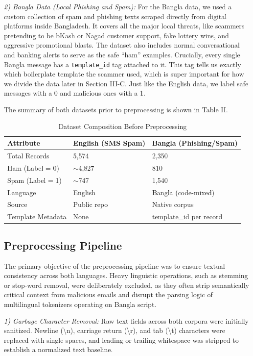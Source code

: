 \documentclass[journal]{IEEEtran}
\begin{document}
\textit{2) Bangla Data (Local Phishing and Spam):} For the Bangla data, we used a custom collection of spam and phishing texts scraped directly from digital platforms inside Bangladesh. It covers all the major local threats, like scammers pretending to be bKash or Nagad customer support, fake lottery wins, and aggressive promotional blasts. The dataset also includes normal conversational and banking alerts to serve as the safe ``ham'' examples. Crucially, every single Bangla message has a \texttt{template\_id} tag attached to it. This tag tells us exactly which boilerplate template the scammer used, which is super important for how we divide the data later in Section III-C. Just like the English data, we label safe messages with a 0 and malicious ones with a 1.

The summary of both datasets prior to preprocessing is shown in Table
II.

\begin{table}[htbp]
\caption{Dataset Composition Before Preprocessing}
\label{tab:dataset_raw}
\centering
\begin{tabular}{lll}
\toprule
\textbf{Attribute} & \textbf{English (SMS Spam)} & \textbf{Bangla (Phishing/Spam)} \\
\midrule
Total Records & 5,574 & 2,350 \\
Ham (Label = 0) & $\sim$4,827 & 810 \\
Spam (Label = 1) & $\sim$747 & 1,540 \\
Language & English & Bangla (code-mixed) \\
Source & Public repo \cite{ref1} & Native corpus \\
Template Metadata & None & template\_id per record \\
\bottomrule
\end{tabular}
\end{table}

\subsection{Preprocessing Pipeline}

The primary objective of the preprocessing pipeline was to ensure textual consistency across both languages. Heavy linguistic operations, such as stemming or stop-word removal, were deliberately excluded, as they often strip semantically critical context from malicious emails and disrupt the parsing logic of multilingual tokenizers operating on Bangla script.

\textit{1) Garbage Character Removal:} Raw text fields across both corpora were initially sanitized. Newline (\textbackslash n), carriage return (\textbackslash r), and tab (\textbackslash t) characters were replaced with single spaces, and leading or trailing whitespace was stripped to establish a normalized text baseline.
\end{document}
